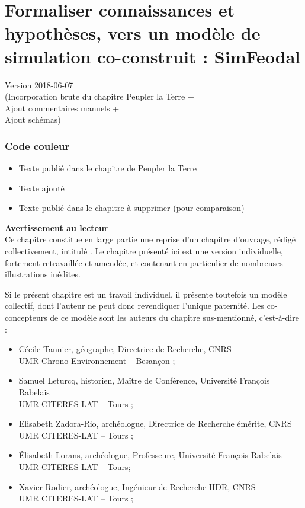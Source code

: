 \chapter{Formaliser connaissances et hypothèses, vers un modèle de simulation co-construit : SimFeodal}
\label{chap:chap2}
\begin{center}
	{\large Version 2018-06-07\\
		(Incorporation brute du chapitre Peupler la Terre +\\ Ajout commentaires manuels +\\ Ajout schémas)}
\end{center}
\minitoc

\clearpage
\subsection*{Code couleur}
\begin{itemize}
	\item Texte publié dans le chapitre de Peupler la Terre
	\item {\blueroman Texte ajouté}
	\item {\redroman Texte publié dans le chapitre à supprimer (pour comparaison)}
\end{itemize}


\begin{mdframed}[backgroundcolor=gray!10,footnoteinside=false]
{\blueroman
	\textbf{Avertissement au lecteur}\\

Ce chapitre constitue en large partie une reprise d'un chapitre d'ouvrage, rédigé collectivement, intitulé  \autocite{cura_transition_2017}.
Le chapitre présenté ici est une version individuelle, fortement retravaillée et amendée, et contenant en particulier de nombreuses illustrations inédites.

Si le présent chapitre est un travail individuel, il présente toutefois un modèle collectif, dont l'auteur ne peut donc revendiquer l'unique paternité.
Les co-concepteurs de ce modèle sont les auteurs du chapitre sus-mentionné, c'est-à-dire :
\begin{itemize}
	\item Cécile Tannier, géographe, Directrice de Recherche, CNRS
	\\UMR Chrono-Environnement -- Besançon ;
	\item Samuel Leturcq, historien, Maître de Conférence, Université François Rabelais
	\\UMR CITERES-LAT -- Tours ; 
	\item Elisabeth Zadora-Rio, archéologue, Directrice de Recherche émérite, CNRS
	\\UMR CITERES-LAT -- Tours ;
	\item Élisabeth Lorans, archéologue, Professeure, Université François-Rabelais \\
	UMR CITERES-LAT -- Tours;
	\item Xavier Rodier, archéologue, Ingénieur de Recherche HDR, CNRS 
	\\UMR CITERES-LAT -- Tours ;
\end{itemize}
}
\end{mdframed}

